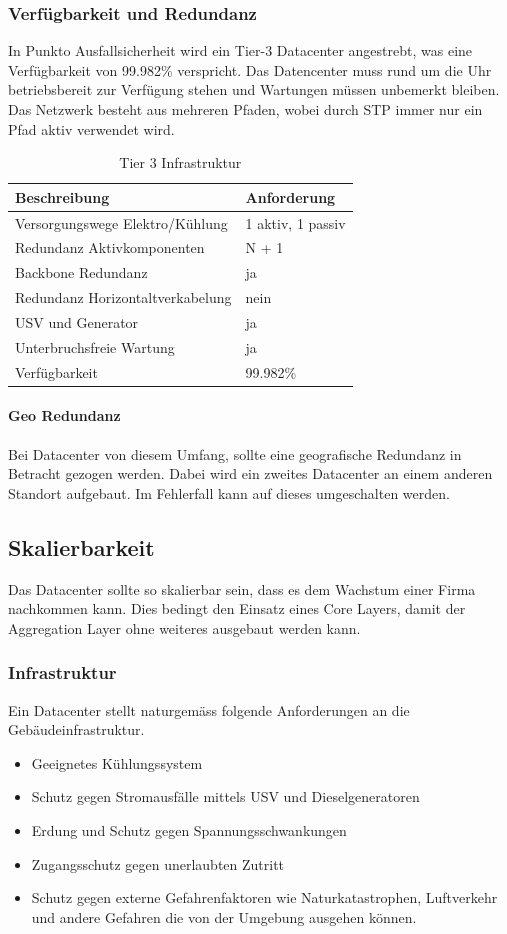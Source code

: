 \subsubsection{Verfügbarkeit und Redundanz}
In Punkto Ausfallsicherheit wird ein Tier-3 Datacenter angestrebt, was eine Verfügbarkeit von 99.982\% verspricht. Das Datencenter muss rund um die Uhr betriebsbereit zur Verfügung stehen und Wartungen müssen unbemerkt bleiben. Das Netzwerk besteht aus mehreren Pfaden, wobei durch STP immer nur ein Pfad aktiv verwendet wird.  
\begin{table}[h]
	\centering
	\begin{tabu}{l l}
		\toprule
		Beschreibung & Anforderung \\
		\midrule
		Versorgungswege Elektro/Kühlung & 1 aktiv, 1 passiv \\
		Redundanz Aktivkomponenten & N + 1 \\
		Backbone Redundanz & ja\\
		Redundanz Horizontaltverkabelung & nein\\
		USV und Generator & ja\\
		Unterbruchsfreie Wartung & ja\\
		Verfügbarkeit & 99.982\% \\
		\bottomrule
	\end{tabu}
	\caption{Tier 3 Infrastruktur}
\end{table}

\paragraph{Geo Redundanz}
Bei Datacenter von diesem Umfang, sollte eine geografische Redundanz in Betracht gezogen werden. Dabei wird ein zweites Datacenter an einem anderen Standort aufgebaut. Im Fehlerfall kann auf dieses umgeschalten werden. 

\subsection{Skalierbarkeit}
Das Datacenter sollte so skalierbar sein, dass es dem Wachstum einer Firma nachkommen kann. Dies bedingt den Einsatz eines Core Layers, damit der Aggregation Layer ohne weiteres ausgebaut werden kann.

\subsubsection{Infrastruktur}
Ein Datacenter stellt naturgemäss folgende Anforderungen an die Gebäudeinfrastruktur.
\begin{itemize}
	\item Geeignetes Kühlungssystem
	\item Schutz gegen Stromausfälle mittels USV und Dieselgeneratoren
	\item Erdung und Schutz gegen Spannungsschwankungen
	\item Zugangsschutz gegen unerlaubten Zutritt
	\item Schutz gegen externe Gefahrenfaktoren wie Naturkatastrophen, Luftverkehr und andere Gefahren die von der Umgebung ausgehen können.
\end{itemize}

